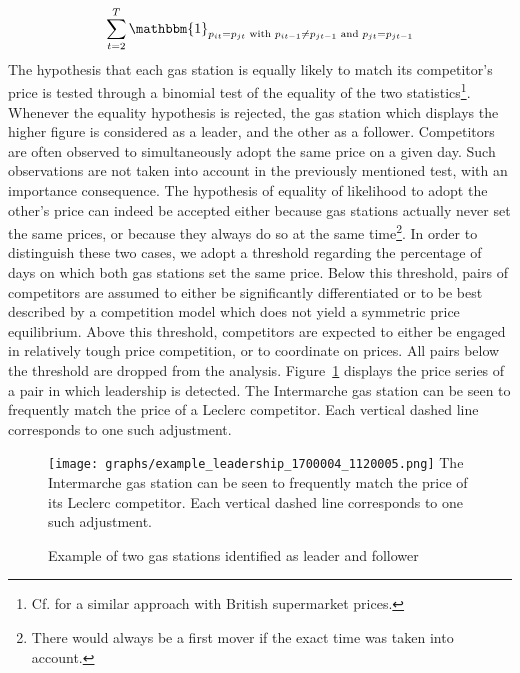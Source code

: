 \documentclass[english]{article}
\begin{document}
 \begin{align*}
\sum_{t=2}^{T}\mathbbm{1}_{p_{it} = p_{jt} \text{ with } p_{it-1} \neq p_{jt-1} \text{ and } p_{jt} = p_{jt-1}}
\end{align*}
The hypothesis that each gas station is equally likely to match its competitor's price is tested through a binomial test of the equality of the two statistics\footnote{Cf. \cite{SEA13} for a similar approach with British supermarket prices.}. Whenever the equality hypothesis is rejected, the gas station which displays the higher figure is considered as a leader, and the other as a follower. Competitors are often observed to simultaneously adopt the same price on a given day. Such observations are not taken into account in the previously mentioned test, with an importance consequence. The hypothesis of equality of likelihood to adopt the other's price can indeed be accepted either because gas stations actually never set the same prices, or because they always do so at the same time\footnote{There would always be a first mover if the exact time was taken into account.}. In order to distinguish these two cases, we adopt a threshold regarding the percentage of days on which both gas stations set the same price. Below this threshold, pairs of competitors are assumed to either be significantly differentiated or to be best described by a competition model which does not yield a symmetric price equilibrium. Above this threshold, competitors are expected to either be engaged in relatively tough price competition, or to coordinate on prices. All pairs below the threshold are dropped from the analysis. Figure~\ref{fig:leader_pair_example} displays the price series of a pair in which leadership is detected. The Intermarche gas station can be seen to frequently match the price of a Leclerc competitor. Each vertical dashed line corresponds to one such adjustment.

\begin{figure}[htb!]
    \caption{Example of two gas stations identified as leader and follower}
	\centering
		\texttt{[image: graphs/example\_leadership\_1700004\_1120005.png]}
\label{fig:leader_pair_example}
\flushleft
\small
The Intermarche gas station can be seen to frequently match the price of its Leclerc competitor. Each vertical dashed line corresponds to one such adjustment.
\end{figure}
\end{document}
